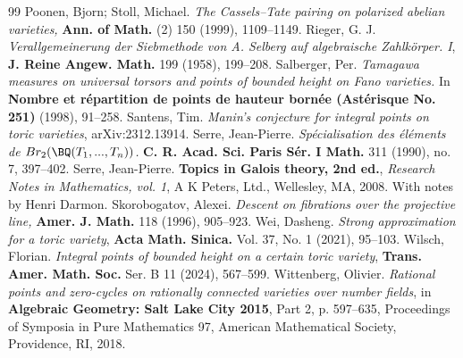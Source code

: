 \begin{thebibliography}{99}
	 Poonen, Bjorn; Stoll, Michael. \emph{The Cassels--Tate pairing on polarized abelian varieties,} \textbf{Ann. of Math.} (2) 150 (1999), 1109--1149.
	 Rieger, G. J.  \emph{Verallgemeinerung der Siebmethode von A. Selberg auf algebraische Zahlkörper. I}, \textbf{J. Reine Angew. Math.} 199 (1958), 199--208.
	 Salberger, Per. \emph{Tamagawa measures on universal torsors and points of bounded height on Fano varieties.} In \textbf{Nombre et répartition de points de hauteur bornée (Astérisque No. 251)} (1998), 91--258. 
	 Santens, Tim. \emph{Manin's conjecture for integral points on toric varieties}, arXiv:2312.13914.
	  Serre, Jean-Pierre. \emph{Spécialisation des éléments de $Br_2(\BQ(T_1, . . . , T_n))$.} \textbf{ C. R. Acad. Sci. Paris Sér. I Math.} 311 (1990), no. 7, 397--402.
	 Serre, Jean-Pierre. \textbf{Topics in Galois theory, 2nd ed.}, \emph{Research Notes in Mathematics, vol. 1}, A K Peters, Ltd., Wellesley, MA, 2008. With notes by Henri Darmon.
	 Skorobogatov, Alexei. \emph{Descent on fibrations over the projective line,} \textbf{Amer. J. Math.} 118 (1996), 905--923.
	 Wei, Dasheng. \emph{Strong approximation for a toric variety},  \textbf{Acta Math. Sinica.} Vol. 37, No. 1 (2021), 95--103. 
	 Wilsch, Florian. \emph{Integral points of bounded height on a certain toric variety}, \textbf{Trans. Amer. Math. Soc.} Ser. B 11 (2024), 567--599. 
	 Wittenberg, Olivier. \emph{Rational points and zero-cycles on rationally connected varieties over number fields}, in \textbf{Algebraic Geometry: Salt Lake City 2015}, Part 2, p. 597--635, Proceedings of Symposia in Pure Mathematics 97, American Mathematical Society, Providence, RI, 2018.
\end{thebibliography}
